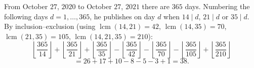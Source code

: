 From October $27$, $2020$ to October $27$, $2021$ there are $365$ days. Numbering the following days $d=1,\dots,365$, he publishes on day $d$ when $14\mid d$, $21\mid d$ or $35\mid d$. By inclusion--exclusion (using $\operatorname{lcm}(14,21)=42$, $\operatorname{lcm}(14,35)=70$, $\operatorname{lcm}(21,35)=105$, $\operatorname{lcm}(14,21,35)=210$):
\[\left\lfloor\dfrac{365}{14}\right\rfloor+\left\lfloor\dfrac{365}{21}\right\rfloor+\left\lfloor\dfrac{365}{35}\right\rfloor-\left\lfloor\dfrac{365}{42}\right\rfloor-\left\lfloor\dfrac{365}{70}\right\rfloor-\left\lfloor\dfrac{365}{105}\right\rfloor+\left\lfloor\dfrac{365}{210}\right\rfloor\]
\[=26+17+10-8-5-3+1=\boxed{38}.\]
